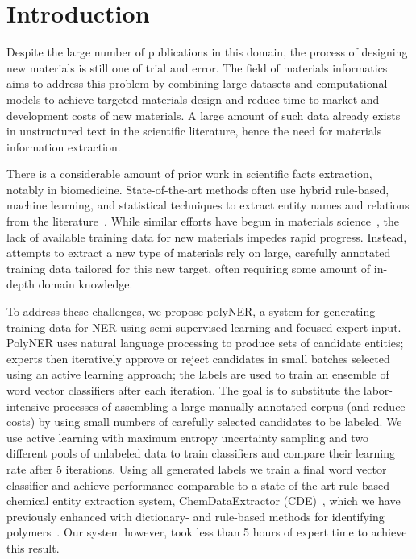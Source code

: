 \section{Introduction}
\label{sect:introduction}


Despite the large number of publications in this domain, the process of designing new materials is still one of trial and
error.
The field of materials informatics aims to address this problem by combining large datasets and computational models to achieve targeted materials design and reduce time-to-market and development costs of new materials.
A large amount of such data already exists in unstructured text in the scientific literature, hence the need for materials information extraction.

There is a considerable amount of prior work in scientific facts extraction, notably in biomedicine. 
State-of-the-art methods often use hybrid rule-based, machine learning, and statistical techniques to extract entity names and relations from the literature~\cite{leaman2008banner,zeng2015survey}. 
While similar efforts have begun in materials science~\cite{hawizy2011chemicaltagger,rocktaschel2012chemspot,leaman2015tmchem,swain2016chemdataextractor}, the lack of available training data for new materials impedes rapid progress. 
Instead, attempts to extract a new type of materials rely  on large, carefully annotated training
data tailored for this new target, often requiring some amount of in-depth domain knowledge.


To address these challenges, we propose polyNER, a system for generating training data for NER using semi-supervised learning and focused expert input. 
PolyNER uses natural language processing to produce sets of candidate entities;
experts then iteratively approve or reject candidates in small batches selected using an active learning approach;
the labels are used to train an ensemble of word vector classifiers after each iteration.
The goal is
to substitute the labor-intensive processes of assembling a large
manually annotated corpus (and reduce costs) by using small numbers of carefully selected candidates to be labeled. 
We use active learning with maximum entropy uncertainty sampling and two different pools of unlabeled data to train classifiers and compare their learning rate after 5 iterations. 
Using all generated labels we train a final word vector classifier and achieve performance comparable to 
a state-of-the art rule-based chemical entity extraction
system, ChemDataExtractor (CDE)~\cite{swain2016chemdataextractor}, which we have previously enhanced
with dictionary- and rule-based methods for identifying polymers~\cite{tchoua2017towards}.
Our system however, took less than 5 hours of expert time to achieve this result.


